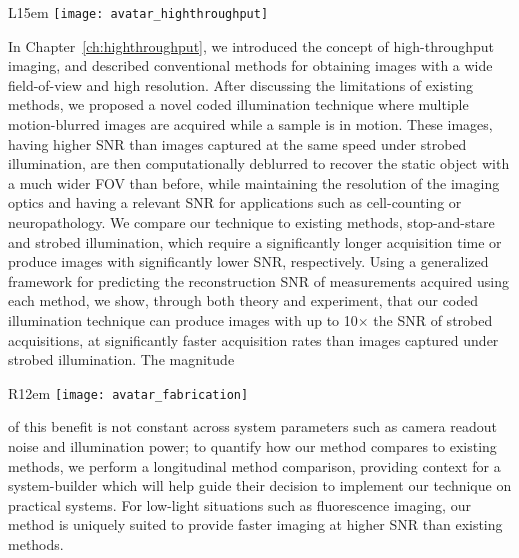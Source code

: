 \begin{wrapfigure}{L}{15em}
  \texttt{[image: avatar\_highthroughput]}
\end{wrapfigure}

In Chapter~\ref{ch:highthroughput}, we introduced the concept of high-throughput imaging, and described conventional methods for obtaining images with a wide field-of-view and high resolution. After discussing the limitations of existing methods, we proposed a novel coded illumination technique where multiple motion-blurred images are acquired while a sample is in motion. These images, having higher SNR than images captured at the same speed under strobed illumination, are then computationally deblurred to recover the static object with a much wider FOV than before, while maintaining the resolution of the imaging optics and having a relevant SNR for applications such as cell-counting or neuropathology. We compare our technique to existing methods, stop-and-stare and strobed illumination, which require a significantly longer acquisition time or produce images with significantly lower SNR, respectively. Using a generalized framework for predicting the reconstruction SNR of measurements acquired using each method, we show, through both theory and experiment, that our coded illumination technique can produce images with up to 10$\times$ the SNR of strobed acquisitions, at significantly faster acquisition rates than images captured under strobed illumination. The magnitude

\begin{wrapfigure}{R}{12em}
  \texttt{[image: avatar\_fabrication]}
\end{wrapfigure}

\noindent of this benefit is not constant across system parameters such as camera readout noise and illumination power; to quantify how our method compares to existing methods, we perform a longitudinal method comparison, providing context for a system-builder which will help guide their decision to implement our technique on practical systems. For low-light situations such as fluorescence imaging, our method is uniquely suited to provide faster imaging at higher SNR than existing methods.



